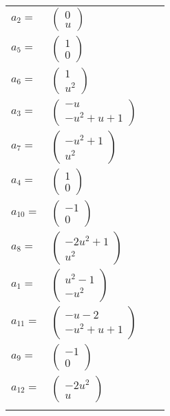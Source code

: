 \documentclass[1p]{elsarticle_modified}
\theoremstyle{definition}
\begin{document}
\begin{tabular}{m{7pt} m{180pt} m{7pt} m{180pt} }
\flushright $a_{2}=$&$\begin{pmatrix}0\\u\end{pmatrix}$ \\
\flushright $a_{5}=$&$\begin{pmatrix}1\\0\end{pmatrix}$ \\
\flushright $a_{6}=$&$\begin{pmatrix}1\\u^2\end{pmatrix}$ \\
\flushright $a_{3}=$&$\begin{pmatrix}- u\\- u^2+u+1\end{pmatrix}$ \\
\flushright $a_{7}=$&$\begin{pmatrix}- u^2+1\\u^2\end{pmatrix}$ \\
\flushright $a_{4}=$&$\begin{pmatrix}1\\0\end{pmatrix}$ \\
\flushright $a_{10}=$&$\begin{pmatrix}-1\\0\end{pmatrix}$ \\
\flushright $a_{8}=$&$\begin{pmatrix}-2 u^2+1\\u^2\end{pmatrix}$ \\
\flushright $a_{1}=$&$\begin{pmatrix}u^2-1\\- u^2\end{pmatrix}$ \\
\flushright $a_{11}=$&$\begin{pmatrix}- u-2\\- u^2+u+1\end{pmatrix}$ \\
\flushright $a_{9}=$&$\begin{pmatrix}-1\\0\end{pmatrix}$ \\
\flushright $a_{12}=$&$\begin{pmatrix}-2 u^2\\u\end{pmatrix}$\\&\end{tabular}
\end{document}

